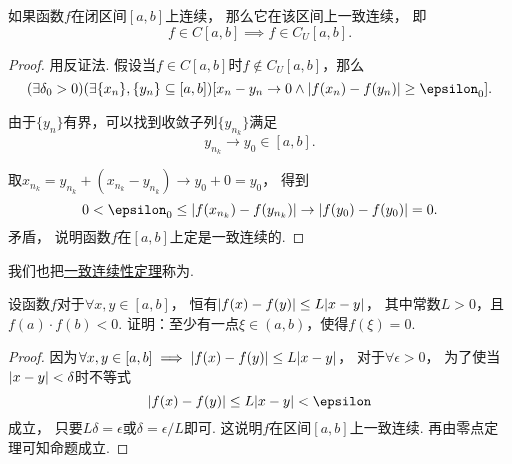 \begin{theorem}[一致连续性定理]\label{theorem:极限.一致连续性定理}
如果函数\(f\)在闭区间\([a,b]\)上连续，
那么它在该区间上一致连续，
即\begin{equation*}
	f \in C[a,b]
	\implies
	f \in C_U[a,b].
\end{equation*}
\begin{proof}
用反证法.
假设当\(f \in C[a,b]\)时\(f \notin C_U[a,b]\)，那么\begin{equation*}
	(\exists\delta_0>0)
	(\exists\{x_n\},\{y_n\}\subseteq[a,b])
	[
		x_n-y_n\to0
		\land
		\abs{f(x_n)-f(y_n)}\geq\epsilon_0
	].
\end{equation*}

由于\(\{y_n\}\)有界，可以找到收敛子列\(\{y_{n_k}\}\)满足\begin{equation*}
	y_{n_k} \to y_0\in[a,b].
\end{equation*}

取\(x_{n_k} = y_{n_k} + (x_{n_k} - y_{n_k})
\to y_0 + 0 = y_0\)，
得到\begin{equation*}
	0 < \epsilon_0 \leq \abs{f(x_{n_k})-f(y_{n_k})}
	\to \abs{f(y_0)-f(y_0)} = 0.
\end{equation*}矛盾，
说明函数\(f\)在\([a,b]\)上定是一致连续的.
\end{proof}
\end{theorem}
我们也把\hyperref[theorem:极限.一致连续性定理]{一致连续性定理}称为.

\begin{example}
设函数\(f\)对于\(\forall x,y \in [a,b]\)，
恒有\(\abs{f(x) - f(y)} \leq L \abs{x - y}\)，
其中常数\(L > 0\)，且\(f(a) \cdot f(b) < 0\).
证明：至少有一点\(\xi \in (a,b)\)，使得\(f(\xi) = 0\).
\begin{proof}
因为\(\forall x,y \in [a,b] \implies \abs{f(x) - f(y)} \leq L \abs{x - y}\)，
对于\(\forall \epsilon > 0\)，
为了使当\(\abs{x - y} < \delta\)时不等式\begin{equation*}
\abs{f(x) - f(y)} \leq L \abs{x - y} < \epsilon
\end{equation*}成立，
只要\(L \delta = \epsilon\)或\(\delta = \epsilon / L\)即可.
这说明\(f\)在区间\([a,b]\)上一致连续.
再由零点定理可知命题成立.
\end{proof}
\end{example}

